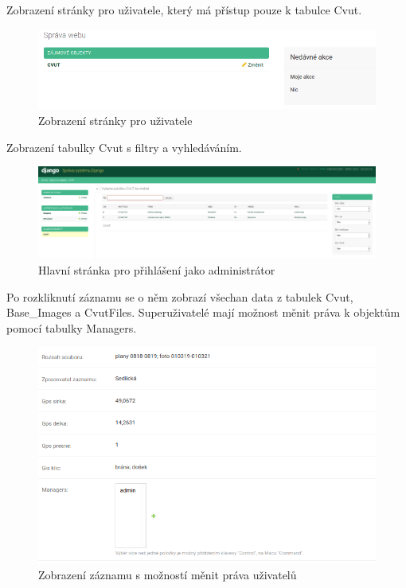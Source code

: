 \newpage

Zobrazení stránky pro uživatele, který má přístup pouze k tabulce Cvut.

\begin{figure}[H] \centering
  \includegraphics[width=320pt]{./pictures/58-uzivatel.png}
    \caption[Zobrazení stránky pro uživatele]{Zobrazení stránky pro uživatele}
	\label{Zobrazení stránky pro uživatele}                                
\end{figure}

Zobrazení tabulky Cvut s filtry a vyhledáváním.

\begin{figure}[H] \centering
  \includegraphics[width=420pt]{./pictures/52-cvut-admin.png}
    \caption[Hlavní stránka pro přihlášení jako administrátor]{Hlavní stránka pro přihlášení jako administrátor}
	\label{Hlavní stránka pro přihlášení jako administrátor}                                
\end{figure}


Po rozkliknutí záznamu se o něm zobrazí všechan data z tabulek Cvut, Base\_Images a CvutFiles. Superuživatelé mají možnost měnit práva k objektům pomocí tabulky Managers.

\begin{figure}[H] \centering
  \includegraphics[width=340pt]{./pictures/53-data-managers.png}
    \caption[Zobrazení záznamu s možností měnit práva uživatelů]{Zobrazení záznamu s možností měnit práva uživatelů}
	\label{Zobrazení záznamu s možností měnit práva uživatelů}                                
\end{figure}


